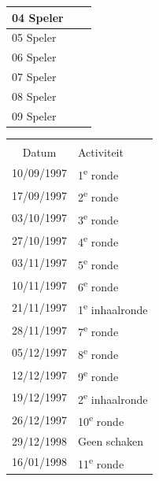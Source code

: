 \documentclass[a4paper]{scrreprt}
\begin{document}
\begin{landscape}
\begin{center}
\begin{tabular}{ l c l }
    04 Speler &  &  \\
    \hline
    05 Speler &  &  \\
    \hline
    06 Speler &  &  \\
    \hline
    07 Speler &  &  \\
    \hline
    08 Speler &  &  \\
    \hline
    09 Speler &  &  \\
    \hline
   \end{tabular}
   \newpage
   \begin{tabular}{ c l }
    \rowcolor{headingkleur}
    \multicolumn{2}{c}{\large\color{headingtekstkleur}Kalender} \\
    \rowcolor{headingkleur}
    \color{headingtekstkleur}Datum & \color{headingtekstkleur}Activiteit \\
\rowcolor{headingkleur!25}
    10/09/1997 & 1\textsuperscript{e} ronde \\
    \hline
\rowcolor{headingkleur!25}
    17/09/1997 & 2\textsuperscript{e} ronde \\
    \hline
\rowcolor{headingkleur!25}
    03/10/1997 & 3\textsuperscript{e} ronde \\
    \hline
\rowcolor{headingkleur!25}
    27/10/1997 & 4\textsuperscript{e} ronde \\
    \hline
\rowcolor{headingkleur!25}
    03/11/1997 & 5\textsuperscript{e} ronde \\
    \hline
\rowcolor{headingkleur!25}
    10/11/1997 & 6\textsuperscript{e} ronde \\
    \hline
\rowcolor{headingkleur!10}
    21/11/1997 & 1\textsuperscript{e} inhaalronde \\
    \hline
\rowcolor{headingkleur!25}
    28/11/1997 & 7\textsuperscript{e} ronde \\
    \hline
\rowcolor{headingkleur!25}
    05/12/1997 & 8\textsuperscript{e} ronde \\
    \hline
\rowcolor{headingkleur!25}
    12/12/1997 & 9\textsuperscript{e} ronde \\
    \hline
\rowcolor{headingkleur!10}
    19/12/1997 & 2\textsuperscript{e} inhaalronde \\
    \hline
\rowcolor{headingkleur!25}
    26/12/1997 & 10\textsuperscript{e} ronde \\
    \hline
    29/12/1998 & Geen schaken \\
    \hline
\rowcolor{headingkleur!25}
    16/01/1998 & 11\textsuperscript{e} ronde \\

\end{tabular}
\end{center}
\end{landscape}
\end{document}
